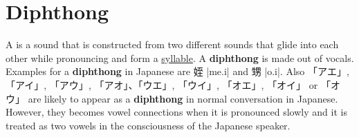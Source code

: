 \section{Diphthong} \label{sec:Diphthong}

A  is a sound that is
constructed from two different sounds that glide into each other while
pronouncing and form a \hyperref[sec:Syllable]{syllable}. A \textbf{diphthong}
is made out of vocals.  Examples for a \textbf{diphthong} in Japanese are {姪}
|me.i| and {甥} |o.i|.  Also  {「アエ」}, {「アイ」}, {「アウ」},
{「アオ」}、{「ウエ」}, {「ウイ」}, {「オエ」}, {「オイ」} or {「オウ」} are
likely to appear as a \textbf{diphthong} in normal conversation in Japanese.
However, they becomes vowel connections when it is pronounced slowly and it is
treated as two vowels in the consciousness of the Japanese speaker.
